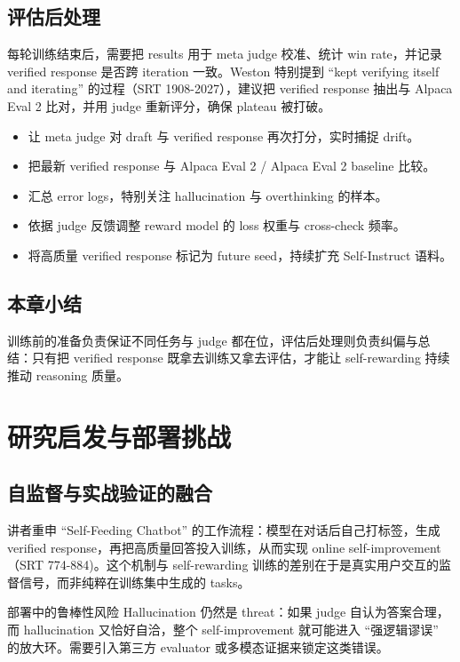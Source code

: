 \documentclass[a4paper]{article}
\begin{document}
\subsection{评估后处理}
每轮训练结束后，需要把 results 用于 meta judge 校准、统计 win rate，并记录 verified response 是否跨 iteration 一致。Weston 特别提到 ``kept verifying itself and iterating'' 的过程（SRT 1908-2027），建议把 verified response 抽出与 Alpaca Eval 2 比对，并用 judge 重新评分，确保 plateau 被打破。

\begin{itemize}
    \item 让 meta judge 对 draft 与 verified response 再次打分，实时捕捉 drift。
    \item 把最新 verified response 与 Alpaca Eval 2 / Alpaca Eval 2 baseline 比较。
    \item 汇总 error logs，特别关注 hallucination 与 overthinking 的样本。
    \item 依据 judge 反馈调整 reward model 的 loss 权重与 cross-check 频率。
    \item 将高质量 verified response 标记为 future seed，持续扩充 Self-Instruct 语料。
\end{itemize}

\subsection{本章小结}
训练前的准备负责保证不同任务与 judge 都在位，评估后处理则负责纠偏与总结：只有把 verified response 既拿去训练又拿去评估，才能让 self-rewarding 持续推动 reasoning 质量。

\section{研究启发与部署挑战}
\subsection{自监督与实战验证的融合}
讲者重申 ``Self-Feeding Chatbot'' 的工作流程：模型在对话后自己打标签，生成 verified response，再把高质量回答投入训练，从而实现 online self-improvement（SRT 774-884)。这个机制与 self-rewarding 训练的差别在于是真实用户交互的监督信号，而非纯粹在训练集中生成的 tasks。

\begin{warningbox}{部署中的鲁棒性风险}
Hallucination 仍然是 threat：如果 judge 自认为答案合理，而 hallucination 又恰好自洽，整个 self-improvement 就可能进入 ``强逻辑谬误'' 的放大环。需要引入第三方 evaluator 或多模态证据来锁定这类错误。
\end{warningbox}
\end{document}
